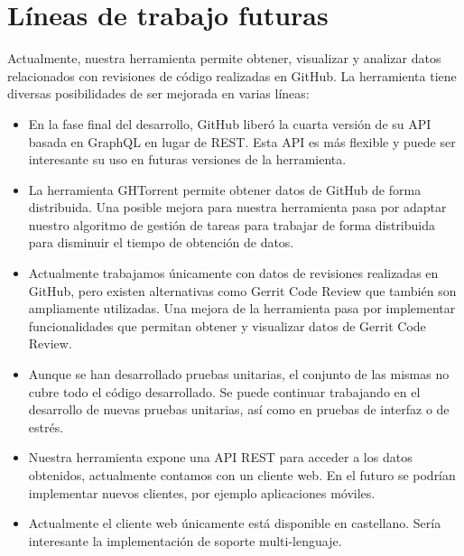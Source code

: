 \section{Líneas de trabajo futuras}

Actualmente, nuestra herramienta permite obtener, visualizar y analizar datos relacionados con revisiones de código realizadas en GitHub. La herramienta tiene diversas posibilidades de ser mejorada en varias líneas:

\begin{itemize}
	\item En la fase final del desarrollo, GitHub liberó la cuarta versión de su API basada en GraphQL \cite{github:api:v4} en lugar de REST. Esta API es más flexible y puede ser interesante su uso en futuras versiones de la herramienta.
	\item La herramienta GHTorrent permite obtener datos de GitHub de forma distribuida. Una posible mejora para nuestra herramienta pasa por adaptar nuestro algoritmo de gestión de tareas para trabajar de forma distribuida para disminuir el tiempo de obtención de datos.
	\item Actualmente trabajamos únicamente con datos de revisiones realizadas en GitHub, pero existen alternativas como Gerrit Code Review que también son ampliamente utilizadas. Una mejora de la herramienta pasa por implementar funcionalidades que permitan obtener y visualizar datos de Gerrit Code Review.
	\item Aunque se han desarrollado pruebas unitarias, el conjunto de las mismas no cubre todo el código desarrollado. Se puede continuar trabajando en el desarrollo de nuevas pruebas unitarias, así como en pruebas de interfaz o de estrés.
	\item Nuestra herramienta expone una API REST para acceder a los datos obtenidos, actualmente contamos con un cliente web. En el futuro se podrían implementar nuevos clientes, por ejemplo aplicaciones móviles.
	\item Actualmente el cliente web únicamente está disponible en castellano. Sería interesante la implementación de soporte multi-lenguaje.
\end{itemize}
